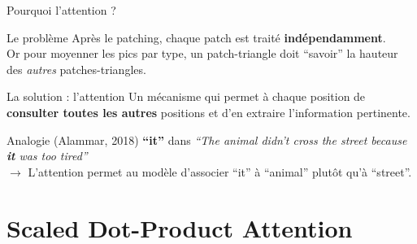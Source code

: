 \documentclass[aspectratio=169, 11pt]{beamer}
\begin{document}
\begin{frame}{Pourquoi l'attention ?}
\begin{block}{Le problème}
Après le patching, chaque patch est traité \textbf{indépendamment}. \\
Or pour moyenner les pics par type, un patch-triangle doit ``savoir'' la hauteur des \emph{autres} patches-triangles.
\end{block}

\vspace{0.5em}

\begin{alertblock}{La solution : l'attention}
Un mécanisme qui permet à chaque position de \textbf{consulter toutes les autres} positions et d'en extraire l'information pertinente.
\end{alertblock}

\vspace{0.5em}

\begin{exampleblock}{Analogie (Alammar, 2018)}
\textbf{``it''} dans \emph{``The animal didn't cross the street because \textbf{it} was too tired''}  \\[0.3em]
$\rightarrow$ L'attention permet au modèle d'associer ``it'' à ``animal'' plutôt qu'à ``street''.
\end{exampleblock}
\end{frame}

\section{Scaled Dot-Product Attention}
\end{document}
